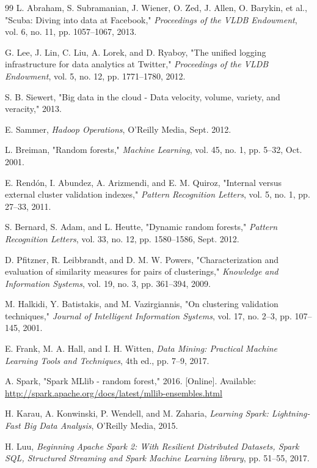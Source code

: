 \documentclass[../main.tex]{subfiles}
\begin{document}
\begin{thebibliography}{99}
 L. Abraham, S. Subramanian, J. Wiener, O. Zed, J. Allen, O. Barykin, et al., "Scuba: Diving into data at Facebook," \textit{Proceedings of the VLDB Endowment}, vol. 6, no. 11, pp. 1057–1067, 2013.

 G. Lee, J. Lin, C. Liu, A. Lorek, and D. Ryaboy, "The unified logging infrastructure for data analytics at Twitter," \textit{Proceedings of the VLDB Endowment}, vol. 5, no. 12, pp. 1771–1780, 2012.

 S. B. Siewert, "Big data in the cloud - Data velocity, volume, variety, and veracity," 2013.

 E. Sammer, \textit{Hadoop Operations}, O'Reilly Media, Sept. 2012.

 L. Breiman, "Random forests," \textit{Machine Learning}, vol. 45, no. 1, pp. 5–32, Oct. 2001.

 E. Rendón, I. Abundez, A. Arizmendi, and E. M. Quiroz, "Internal versus external cluster validation indexes," \textit{Pattern Recognition Letters}, vol. 5, no. 1, pp. 27–33, 2011.

 S. Bernard, S. Adam, and L. Heutte, "Dynamic random forests," \textit{Pattern Recognition Letters}, vol. 33, no. 12, pp. 1580–1586, Sept. 2012.

 D. Pfitzner, R. Leibbrandt, and D. M. W. Powers, "Characterization and evaluation of similarity measures for pairs of clusterings," \textit{Knowledge and Information Systems}, vol. 19, no. 3, pp. 361–394, 2009.

 M. Halkidi, Y. Batistakis, and M. Vazirgiannis, "On clustering validation techniques," \textit{Journal of Intelligent Information Systems}, vol. 17, no. 2–3, pp. 107–145, 2001.

 E. Frank, M. A. Hall, and I. H. Witten, \textit{Data Mining: Practical Machine Learning Tools and Techniques}, 4th ed., pp. 7–9, 2017.

 A. Spark, "Spark MLlib - random forest," 2016. [Online]. Available: \url{http://spark.apache.org/docs/latest/mllib-ensembles.html}

 H. Karau, A. Konwinski, P. Wendell, and M. Zaharia, \textit{Learning Spark: Lightning-Fast Big Data Analysis}, O'Reilly Media, 2015.

 H. Luu, \textit{Beginning Apache Spark 2: With Resilient Distributed Datasets, Spark SQL, Structured Streaming and Spark Machine Learning library}, pp. 51–55, 2017.


\end{thebibliography}
\end{document}
